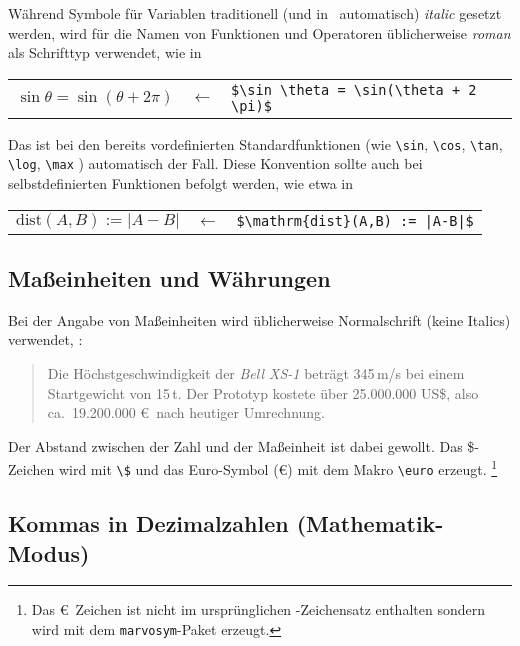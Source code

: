 Während Symbole für Variablen traditionell (und in \latex\ automatisch)
\emph{italic} gesetzt werden, wird für die Namen von Funktionen und
Operatoren üblicherweise \emph{roman} als Schrifttyp verwendet, wie \zB in
%
\begin{center}
	\begin{tabular}{lcl}
		$\sin \theta = \sin(\theta + 2 \pi)$ &
		$\leftarrow$ & \verb!$\sin \theta = \sin(\theta + 2 \pi)$! \\
	\end{tabular}
\end{center}
%
Das ist bei den bereits vordefinierten Standardfunktionen (wie \verb!\sin!,
\verb!\cos!, \verb!\tan!, \verb!\log!, \verb!\max! \uva) automatisch der Fall.
Diese Konvention sollte auch bei selbstdefinierten Funktionen befolgt werden,
wie etwa in
%
\begin{center}
	\begin{tabular}{lcl}
	$\mathrm{dist}(A,B) := |A-B|$ & $\leftarrow$ & 
	\verb!$\mathrm{dist}(A,B) := |A-B|$! \\
	\end{tabular}
\end{center}


\subsection{Maßeinheiten und Währungen}

Bei der Angabe von Maßeinheiten wird üblicherweise Normalschrift (keine
Italics) verwendet, \zB:
%
\begin{quote}
	Die Höchstgeschwindigkeit der \textit{Bell XS-1} beträgt 345\,m/s bei
	einem Startgewicht von 15\,t. Der Prototyp kostete über 25.000.000 US\$,
	also ca.\ 19.200.000 \euro\ nach heutiger Umrechnung.
\end{quote}
%
Der Abstand zwischen der Zahl und der Maßeinheit ist dabei gewollt. Das
\$-Zeichen wird mit \verb!\$! und das Euro-Symbol (\euro) mit dem Makro
\verb!\euro! erzeugt.%
\footnote{Das \euro\ Zeichen ist nicht im ursprünglichen \latex-Zeichensatz
enthalten sondern wird mit dem \texttt{marvosym}-Paket erzeugt.}


\subsection{Kommas in Dezimalzahlen (Mathematik-Modus)}

